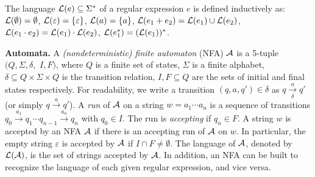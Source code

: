 The language $\mathcal{L}(e)\subseteq\Sigma^*$ of a regular expression $e$ is defined %
	inductively as: $\mathcal{L}(\emptyset) =\emptyset$,
	$\mathcal{L}(\varepsilon) =\{\varepsilon\}$,
	$\mathcal{L}(a)= \{a\}$,
	$\mathcal{L}(e_1 + e_2) = \mathcal{L}(e_1) \cup \mathcal{L}(e_2)$,
	$\mathcal{L}(e_1 \cdot e_2) = \mathcal{L}(e_1) \cdot \mathcal{L}(e_2)$,
	$\mathcal{L}(e_1^*)=(\mathcal{L}(e_1))^*$. 



\smallskip
\noindent \textbf{Automata.} A \emph{(nondeterministic) finite automaton} (NFA) $\mathcal{A}$ is a 5-tuple $(Q, \Sigma, \delta,$ $ I, F)$, where $Q$ is a finite set of states, $\Sigma$ is a finite alphabet, $\delta \subseteq Q \times \Sigma \times Q$ is the transition relation, $I,F \subseteq Q$ are the sets of initial and final states respectively. For readability, we write a transition $(q, a, q') \in \delta$ as $q \xrightarrow[\delta]{a} q'$ (or simply $q \xrightarrow{a} q'$). %
%
A \emph{run} of $\mathcal{A}$ on a string $w = a_1 \cdots a_n$ is a sequence of transitions $q_0 \xrightarrow{a_1} q_1 \cdots q_{n-1} \xrightarrow{a_n} q_n$ with $q_0 \in I$. The run is \emph{accepting} if $q_n \in F$.
A string $w$ is accepted by an NFA $\mathcal{A}$ if there is an accepting run of $\mathcal{A}$ on $w$. In particular, the empty string $\varepsilon$ is accepted by $\mathcal{A}$ if $I \cap F \neq \emptyset$. The language of $\mathcal{A}$, denoted by $\mathcal{L}(\mathcal{A})$, is the set of strings accepted by $\mathcal{A}$. In addition, an NFA can be built to recognize the language of each given regular expression, and vice versa.

